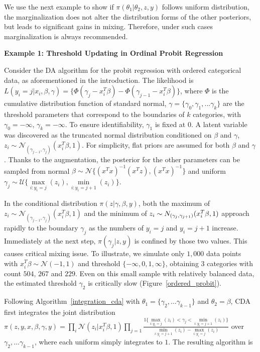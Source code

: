 \documentclass[10pt]{article}
\begin{document}
We use the next example to show if $\pi(\theta_1| \theta_2,z,y)$  follows uniform distribution, the marginalization does not alter the distribution forms of the other posteriors, but leads to significant gains in mixing. Therefore, under such cases marginalization is always recommended.

{\bf Example 1: Threshold Updating in Ordinal Probit Regression}

Consider the \cite{albert1993bayesian} DA algorithm for the probit regression with ordered categorical data, as aforementioned in the introduction. The likelihood is $L(y_i=j|x_i,\beta,\gamma)= \{  \Phi( \gamma_j- x^T_i\beta) -  \Phi( \gamma_{j-1}- x^T_i\beta)    \}$, where $\Phi$ is the cumulative distribution function of standard normal, $\gamma=\{\gamma_0,\gamma_1,...\gamma_k\}$ are the threshold parameters that correspond to the boundaries of $k$ categories, with $\gamma_0=-\infty$, $\gamma_k=-\infty$. To ensure identifiability, $\gamma_1$ is fixed at $0$. A latent variable was discovered as the truncated normal distribution conditioned on $\beta$ and $\gamma$, $z_i \sim \mathcal N_{(\gamma_{j-1}, \gamma_{j})}(x^T_i\beta,1)$. For simplicity, flat priors are assumed for both $\beta$ and $\gamma$. Thanks to the augmentation, the posterior for the other parameters  can be sampled from  normal $\beta \sim \mathcal{N} \{   (x^Tx)^{-1}(x^Tz),(x^Tx)^{-1} \}$ and uniform $\gamma_j \sim \mathcal{U}\{ \underset{i:y_i=j}{\max}(z_i),  \underset{i:y_i=j+1}{\min} (z_i)  \}$.

In the conditional distribution $\pi( z|\gamma,\beta,y) $, both the maximum of $z_i \sim \mathcal N_{(\gamma_{j-1}, \gamma_{j})}(x^T_i\beta,1)$ and the minimum of $z_i \sim \mathcal \mathcal{N}_{(\gamma_{j}, \gamma_{j+1})}(x^T_i\beta,1)$ approach rapidly to the boundary $\gamma_j$ as the numbers of $y_i=j$ and $y_i=j+1$ increase. Immediately at the next step,  $\pi( \gamma_j| z,y) $ is confined by those two values. This causes critical mixing issue. To illustrate, we simulate only $1,000$ data points with $x_i^T\beta \sim \mathcal{N}(-1,1)$ and threshold $\{-\infty, 0, 1, \infty\}$, obtaining 3 categories with count $504$, $267$ and $229$. Even on this small sample with relatively balanced data, the estimated threshold $\gamma_2$ is critically slow (Figure~\ref{ordered_probit}).

Following Algorithm~\ref{integration_cda} with $\theta_1=\{ \gamma_2,\ldots \gamma_{k-1}\}$ and $\theta_2=\beta$, CDA first integrates the joint distribution $\pi(z,y,x,\beta,\gamma,y)= \prod_i  {\mathcal N} (z_i |x^T_i\beta,1)   \prod_{j=1} \frac{1 \{ \underset{i:y_i=j}{\max}(z_i) < \gamma_j< \underset{i:y_i=j+1}{\min} (z_i) \}}{\underset{i:y_i=j+1}{\min} (z_i) -\underset{i:y_i=j}{\max}(z_i) }$ over $\gamma_2,\ldots \gamma_{k-1}$, where each uniform simply integrates to $1$. The resulting algorithm is 
\end{document}
